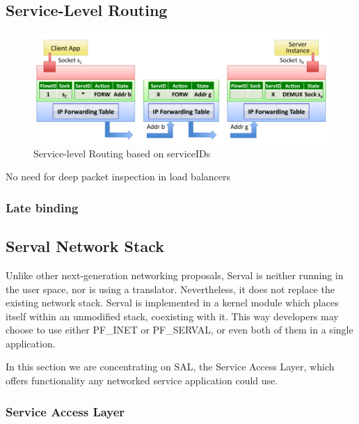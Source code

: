 \subsection{Service-Level Routing}
\begin{figure}
\centering
{}
\includegraphics[scale=0.3]{figures/service_level_routing}
\caption[Service-Level Routing]{Service-level Routing based on serviceIDs}
\label{fig:ser_resol}
\end{figure}


No need for deep packet inspection in load balancers



\subsubsection{Late binding}







\newpage
\subsection{Serval Network Stack}
Unlike other next-generation networking proposals, Serval is neither running in the user space, nor is using a translator.
Nevertheless, it does not replace the existing network stack.
Serval is implemented in a kernel module which places itself within an unmodified stack, coexisting with it.
This way developers may choose to use either PF\_INET or PF\_SERVAL, or even both of them in a single application.

In this section we are concentrating on SAL, the Service Access Layer, which offers functionality any
networked service application could use.


\subsubsection{Service Access Layer}

